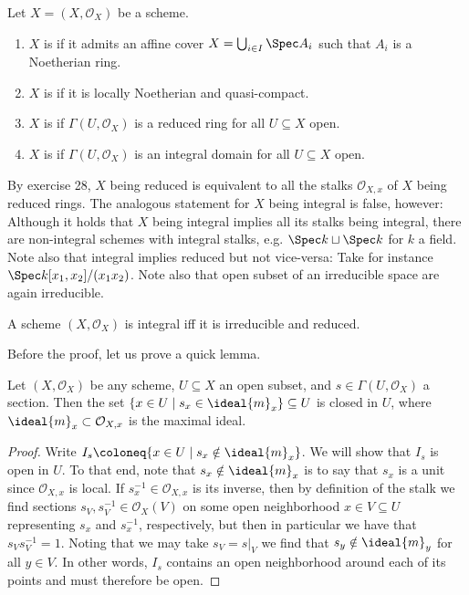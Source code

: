 \documentclass[wip, algebra]{bsteffan-lecturenotes}
\newcommand{\cO}{\mathcal{O}}
\begin{document}
\begin{definition}
	Let $X = (X, \cO_X)$ be a scheme.
	\begin{enumerate}
		\item $X$ is  if it admits an affine cover $X = \bigcup_{i \in I} \Spec A_i$ such that $A_i$ is a Noetherian ring.
		\item $X$ is  if it is locally Noetherian and quasi-compact.
		\item $X$ is  if $\Gamma(U, \cO_X)$ is a reduced ring for all $U \subseteq X$ open.
		\item $X$ is  if $\Gamma(U, \cO_X)$ is an integral domain for all $U \subseteq X$ open.	
	\end{enumerate}
\end{definition}
By exercise 28, $X$ being reduced is equivalent to all the stalks $\cO_{X, x}$ of $X$ being reduced rings.
The analogous statement for $X$ being integral is false, however: 
Although it holds that $X$ being integral implies all its stalks being integral, there are non-integral schemes with integral stalks, e.g. $\Spec k \sqcup \Spec k$ for $k$ a field.
Note also that integral implies reduced but not vice-versa: 
Take for instance $\Spec k[x_1, x_2] / (x_1 x_2)$.
Note also that open subset of an irreducible space are again irreducible.
\begin{proposition}\label{prp:intiffirredred}
	A scheme $(X, \cO_X)$ is integral iff it is irreducible and reduced.
\end{proposition}
Before the proof, let us prove a quick lemma.
\begin{lemma}
	Let $(X, \cO_X)$ be any scheme, $U \subseteq X$ an open subset, and $s \in \Gamma(U, \cO_X)$ a section.
	Then the set $\{x \in U \mid s_x \in \ideal{m}_x\} \subseteq U$ is closed in $U$, where $\ideal{m}_x \subset \cO_{X, x}$ is the maximal ideal.
\end{lemma}
\begin{proof}
	Write $I_s \coloneq \{x \in U \mid s_x \notin \ideal{m}_x\}$.
	We will show that $I_s$ is open in $U$.
	To that end, note that $s_x \notin \ideal{m}_x$ is to say that $s_x$ is a unit since $\cO_{X, x}$ is local.
	If $s_x^{-1} \in \cO_{X, x}$ is its inverse, then by definition of the stalk we find sections $s_V, s_V^{-1} \in \cO_X(V)$ on some open neighborhood $x \in V \subseteq U$ representing $s_x$ and $s_x^{-1}$, respectively, but then in particular we have that $s_V s_V^{-1} = 1$.
	Noting that we may take $s_V = s|_V$ we find that $s_y \notin \ideal{m}_y$ for all $y \in V$.
	In other words, $I_s$ contains an open neighborhood around each of its points and must therefore be open.
\end{proof}
\end{document}
